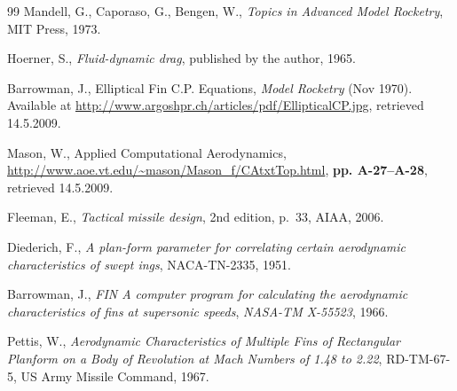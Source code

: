 \documentclass[a4paper,12pt,oneside]{book}
\begin{document}
\begin{thebibliography}{99}
 Mandell, G., Caporaso, G., Bengen,
  W., {\it Topics in Advanced Model Rocketry}, MIT Press, 1973.

 Hoerner, S., {\it Fluid-dynamic drag}, published by
  the author, 1965.
%

 Barrowman, J., Elliptical Fin
  C.P. Equations, {\it Model Rocketry} (Nov 1970).  Available at
  \url{http://www.argoshpr.ch/articles/pdf/EllipticalCP.jpg},
  retrieved 14.5.2009.

 Mason, W., Applied Computational
  Aerodynamics,
  \url{http://www.aoe.vt.edu/~mason/Mason_f/CAtxtTop.html}, 
  {\bf pp. A-27--A-28}, retrieved 14.5.2009.

 Fleeman, E., {\it Tactical missile design}, 2nd
  edition, p.~33, AIAA, 2006.

 Diederich, F., {\it A plan-form parameter for
 correlating certain aerodynamic characteristics of swept ings},
 NACA-TN-2335, 1951.

 Barrowman, J., {\it FIN A computer program for
  calculating the aerodynamic characteristics of fins at supersonic
  speeds}, {\it NASA-TM X-55523}, 1966.

 Pettis, W., {\it Aerodynamic Characteristics of
  Multiple Fins of Rectangular Planform on a Body of Revolution at
  Mach Numbers of 1.48 to 2.22}, RD-TM-67-5, US Army Missile
  Command, 1967.


\end{thebibliography}
\end{document}
